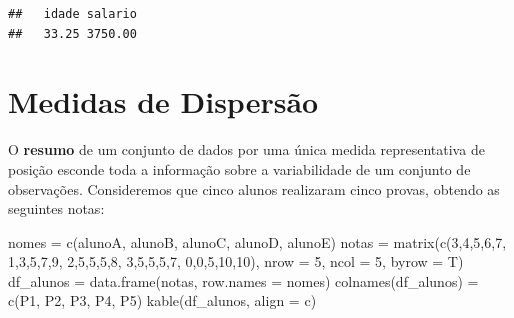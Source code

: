 \documentclass[
]{book}
\newenvironment{Shaded}{\begin{snugshade}}{\end{snugshade}}
\newcommand{\AttributeTok}[1]{\textcolor[rgb]{0.77,0.63,0.00}{#1}}
\newcommand{\DecValTok}[1]{\textcolor[rgb]{0.00,0.00,0.81}{#1}}
\newcommand{\FunctionTok}[1]{\textcolor[rgb]{0.00,0.00,0.00}{#1}}
\newcommand{\NormalTok}[1]{#1}
\newcommand{\OtherTok}[1]{\textcolor[rgb]{0.56,0.35,0.01}{#1}}
\newcommand{\StringTok}[1]{\textcolor[rgb]{0.31,0.60,0.02}{#1}}
\begin{document}
\begin{verbatim}
##   idade salario 
##   33.25 3750.00
\end{verbatim}

\hypertarget{medidas-de-dispersuxe3o}{%
\section{Medidas de Dispersão}\label{medidas-de-dispersuxe3o}}

O \textbf{resumo} de um conjunto de dados por uma única medida representativa de posição esconde toda a informação sobre a variabilidade de um conjunto de observações. Consideremos que cinco alunos realizaram cinco provas, obtendo as seguintes notas:

\begin{Shaded}
\begin{Highlighting}[]
\NormalTok{nomes }\OtherTok{=} \FunctionTok{c}\NormalTok{(}\StringTok{\textquotesingle{}alunoA\textquotesingle{}}\NormalTok{, }\StringTok{\textquotesingle{}alunoB\textquotesingle{}}\NormalTok{, }\StringTok{\textquotesingle{}alunoC\textquotesingle{}}\NormalTok{,}
          \StringTok{\textquotesingle{}alunoD\textquotesingle{}}\NormalTok{, }\StringTok{\textquotesingle{}alunoE\textquotesingle{}}\NormalTok{)}
\NormalTok{notas }\OtherTok{=} \FunctionTok{matrix}\NormalTok{(}\FunctionTok{c}\NormalTok{(}\DecValTok{3}\NormalTok{,}\DecValTok{4}\NormalTok{,}\DecValTok{5}\NormalTok{,}\DecValTok{6}\NormalTok{,}\DecValTok{7}\NormalTok{,}
               \DecValTok{1}\NormalTok{,}\DecValTok{3}\NormalTok{,}\DecValTok{5}\NormalTok{,}\DecValTok{7}\NormalTok{,}\DecValTok{9}\NormalTok{,}
               \DecValTok{2}\NormalTok{,}\DecValTok{5}\NormalTok{,}\DecValTok{5}\NormalTok{,}\DecValTok{5}\NormalTok{,}\DecValTok{8}\NormalTok{,}
               \DecValTok{3}\NormalTok{,}\DecValTok{5}\NormalTok{,}\DecValTok{5}\NormalTok{,}\DecValTok{5}\NormalTok{,}\DecValTok{7}\NormalTok{,}
               \DecValTok{0}\NormalTok{,}\DecValTok{0}\NormalTok{,}\DecValTok{5}\NormalTok{,}\DecValTok{10}\NormalTok{,}\DecValTok{10}\NormalTok{), }\AttributeTok{nrow =} \DecValTok{5}\NormalTok{, }\AttributeTok{ncol =} \DecValTok{5}\NormalTok{, }\AttributeTok{byrow =}\NormalTok{ T)}
\NormalTok{df\_alunos }\OtherTok{=} \FunctionTok{data.frame}\NormalTok{(notas, }\AttributeTok{row.names =}\NormalTok{ nomes)}
\FunctionTok{colnames}\NormalTok{(df\_alunos) }\OtherTok{=} \FunctionTok{c}\NormalTok{(}\StringTok{\textquotesingle{}P1\textquotesingle{}}\NormalTok{, }\StringTok{\textquotesingle{}P2\textquotesingle{}}\NormalTok{, }\StringTok{\textquotesingle{}P3\textquotesingle{}}\NormalTok{, }\StringTok{\textquotesingle{}P4\textquotesingle{}}\NormalTok{, }\StringTok{\textquotesingle{}P5\textquotesingle{}}\NormalTok{)}
\FunctionTok{kable}\NormalTok{(df\_alunos, }\AttributeTok{align =} \StringTok{\textquotesingle{}c\textquotesingle{}}\NormalTok{)}
\end{Highlighting}
\end{Shaded}
\end{document}
